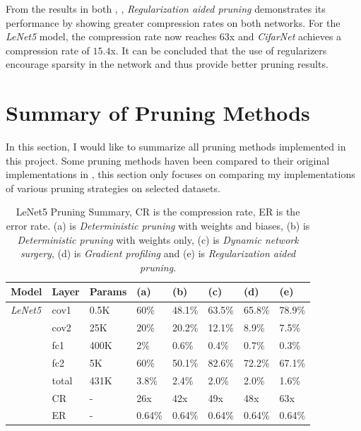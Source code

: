 \documentclass[a4paper,12pt]{report}
\begin{document}
From the results in both , ,
\textit{Regularization aided pruning} demonstrates its performance by showing
greater compression rates on both networks.
For the \textit{LeNet5} model, the compression rate now reaches $63$x and
\textit{CifarNet} achieves a compression rate of $15.4$x.
It can be concluded that the use of regularizers encourage sparsity in the
network and thus provide better pruning results.

\section{Summary of Pruning Methods}
\label{sec:pruning_sum}
In this section, I would like to summarize all pruning methods implemented in
this project.
Some pruning methods haven been compared to their original implementations in
, this section only focuses on comparing my implementations
of various pruning strategies on selected datasets.



\begin{table}[!h]
  \centering
  \begin{tabular}{llllllll}
    \hline
    Model   &Layer     &Params    &(a)    &(b)      &(c)    &(d)      &(e)\\
    \hline
    \textit{LeNet5}  &cov1     &0.5K       &60\%   &48.1\%   &63.5\% &65.8\%   &78.9\%\\
            &cov2     &25K        &20\%   &20.2\%   &12.1\% &8.9\%    &7.5\%\\
            &fc1      &400K       &2\%    &0.6\%    &0.4\%  &0.7\%    &0.3\%\\
            &fc2      &5K         &60\%   &50.1\%   &82.6\% &72.2\%   &67.1\%\\
            &total    &431K       &3.8\%  &2.4\%    &2.0\%  &2.0\%    &1.6\%\\
    \hline

            &CR       &-          &26x     &42x       &49x  &48x      &63x\\
            &ER       &-          &0.64\%  &0.64\%    &0.64\% &0.64\% &0.64\%\\
    \hline
  \end{tabular}
  \caption{LeNet5 Pruning Summary, CR is the compression
  rate, ER is the error rate. (a) is \textit{Deterministic pruning} with weights and biases, (b) is
  \textit{Deterministic pruning} with weights only, (c) is \textit{Dynamic network surgery},
  (d) is \textit{Gradient profiling} and (e) is \textit{Regularization aided pruning}.}
  \label{fig:prune_new_summary}
\end{table}
\end{document}
